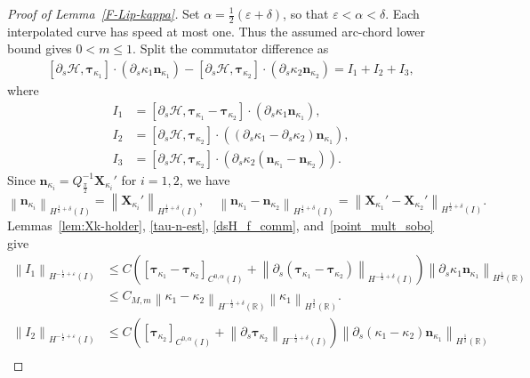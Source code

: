 \documentclass[11pt,reqno]{amsart}
\theoremstyle{plain}
\theoremstyle{definition}
\numberwithin{equation}{section}
\newcommand{\paren}[1]{\left(#1\right)}
\newcommand{\p}{\partial}
\newcommand{\mc}[1]{\mathcal{#1}}
\newcommand{\bm}[1]{\boldsymbol{#1}}
\newcommand{\norm}[1]{\left\lVert #1 \right\rVert}
\newcommand{\R}{\mathbb{R}}
\newcommand{\tka}[1]{\bm\tau_{\kappa_{#1}}}
\newcommand{\nka}[1]{\bm n_{\kappa_{#1}}}
\newcommand{\xka}[1]{\bm X_{\kappa_{#1}}}
\newcommand{\ci}[1]{C^{#1}(I)}
\newcommand{\hi}[1]{H^{#1}(I)}
\newcommand{\hr}[1]{H^{#1}(\R)}
\begin{document}
\begin{proof}[Proof of Lemma~\ref{F-Lip-kappa}]
Set $\alpha=\frac{1}{2}\paren{\varepsilon+\delta}$, so that
$\varepsilon<\alpha<\delta$. Each interpolated curve has speed at most one.
Thus the assumed arc-chord lower bound gives $0<m\le 1$.
Split the commutator difference as
\begin{equation}
\begin{aligned}
    [\p_s\mc H,  \tka{1}]\cdot (\p_s \kappa_1 \nka{1}) - [\p_s\mc H, \tka{2}]\cdot (\p_s \kappa_2 \nka{2}) = I_1 + I_2 + I_3,
\end{aligned}
\end{equation}
where
\begin{align}
    I_1 &= [\p_s\mc H,  \tka{1}-\tka{2}]\cdot (\p_s \kappa_1 \nka{1}) , \\
    I_2 &= [\p_s\mc H,  \tka{2}]\cdot ( (\p_s \kappa_1 -\p_s\kappa_2)\nka{1}) , \\
    I_3 &= [\p_s\mc H,  \tka{2}]\cdot (\p_s \kappa_2( \nka{1} - \nka{2})) .
\end{align}
Since $\nka{i}=Q_{\frac{\pi}{2}}^{-1}\xka{i}'$ for $i=1,2$, we have
\begin{equation}
    \norm{\nka{i}}_{\hi{\frac{1}{2}+\delta}} = \norm{\xka{i}'}_{\hi{\frac{1}{2}+\delta}},
    \quad
    \norm{\nka{1}-\nka{2}}_{\hi{\frac{1}{2}+\delta}}
    = \norm{\xka{1}'-\xka{2}'}_{\hi{\frac{1}{2}+\delta}}.
\end{equation}
Lemmas~\ref{lem:Xk-holder}, \ref{tau-n-est}, \ref{dsH_f_comm},
and~\ref{point_mult_sobo} give
\begin{equation}
\begin{aligned}
    \norm{I_1}_{\hi{-\frac{1}{2}+\varepsilon}} &\le C \paren{ [\tka{1}-\tka{2}]_{\ci{0,\alpha}} + \norm{\p_s(\tka{1}-\tka{2})}_{\hi{-\frac{1}{2}+\delta}}  } \norm{\p_s \kappa_1 \nka{1}}_{\hr{\frac{1}{2}}}\\
    &\le C_{M,m} \norm{\kappa_1-\kappa_2}_{\hr{-\frac{1}{2}+\delta}}\norm{\kappa_1}_{\hr{\frac{3}{2}}}.
\end{aligned}
\end{equation}
\begin{equation}
\begin{aligned}
    \norm{I_2}_{\hi{-\frac{1}{2}+\varepsilon}} &\le C \paren{ [\tka{2}]_{\ci{0,\alpha}} + \norm{\p_s\tka{2}}_{\hi{-\frac{1}{2}+\delta}}  } \norm{\p_s (\kappa_1-\kappa_2) \nka{1}}_{\hr{\frac{1}{2}}}\\

\end{aligned}
\end{equation}
\end{proof}
\end{document}
